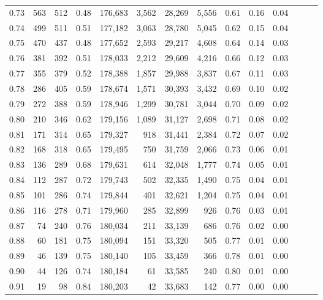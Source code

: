 \begin{tabular}{rrrrrrrrrrrrrr}
0.73 &    563 &  512 &  0.48 &  176,683 &    3,562 &  28,269 &   5,556 &  0.61 &  0.16 &      0.04 \\
0.74 &    499 &  511 &  0.51 &  177,182 &    3,063 &  28,780 &   5,045 &  0.62 &  0.15 &      0.04 \\
0.75 &    470 &  437 &  0.48 &  177,652 &    2,593 &  29,217 &   4,608 &  0.64 &  0.14 &      0.03 \\
0.76 &    381 &  392 &  0.51 &  178,033 &    2,212 &  29,609 &   4,216 &  0.66 &  0.12 &      0.03 \\
0.77 &    355 &  379 &  0.52 &  178,388 &    1,857 &  29,988 &   3,837 &  0.67 &  0.11 &      0.03 \\
0.78 &    286 &  405 &  0.59 &  178,674 &    1,571 &  30,393 &   3,432 &  0.69 &  0.10 &      0.02 \\
0.79 &    272 &  388 &  0.59 &  178,946 &    1,299 &  30,781 &   3,044 &  0.70 &  0.09 &      0.02 \\
0.80 &    210 &  346 &  0.62 &  179,156 &    1,089 &  31,127 &   2,698 &  0.71 &  0.08 &      0.02 \\
0.81 &    171 &  314 &  0.65 &  179,327 &      918 &  31,441 &   2,384 &  0.72 &  0.07 &      0.02 \\
0.82 &    168 &  318 &  0.65 &  179,495 &      750 &  31,759 &   2,066 &  0.73 &  0.06 &      0.01 \\
0.83 &    136 &  289 &  0.68 &  179,631 &      614 &  32,048 &   1,777 &  0.74 &  0.05 &      0.01 \\
0.84 &    112 &  287 &  0.72 &  179,743 &      502 &  32,335 &   1,490 &  0.75 &  0.04 &      0.01 \\
0.85 &    101 &  286 &  0.74 &  179,844 &      401 &  32,621 &   1,204 &  0.75 &  0.04 &      0.01 \\
0.86 &    116 &  278 &  0.71 &  179,960 &      285 &  32,899 &     926 &  0.76 &  0.03 &      0.01 \\
0.87 &     74 &  240 &  0.76 &  180,034 &      211 &  33,139 &     686 &  0.76 &  0.02 &      0.00 \\
0.88 &     60 &  181 &  0.75 &  180,094 &      151 &  33,320 &     505 &  0.77 &  0.01 &      0.00 \\
0.89 &     46 &  139 &  0.75 &  180,140 &      105 &  33,459 &     366 &  0.78 &  0.01 &      0.00 \\
0.90 &     44 &  126 &  0.74 &  180,184 &       61 &  33,585 &     240 &  0.80 &  0.01 &      0.00 \\
0.91 &     19 &   98 &  0.84 &  180,203 &       42 &  33,683 &     142 &  0.77 &  0.00 &      0.00 \\

\end{tabular}
